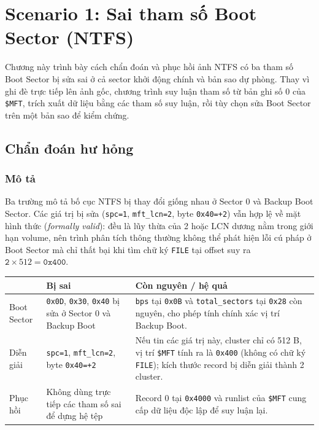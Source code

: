 \chapter{Scenario 1: Sai tham số Boot Sector (NTFS)}

Chương này trình bày cách chẩn đoán và phục hồi ảnh NTFS có ba tham số Boot Sector bị sửa sai ở cả sector khởi động chính và bản sao dự phòng. Thay vì ghi đè trực tiếp lên ảnh gốc, chương trình suy luận tham số từ bản ghi số 0 của \texttt{\$MFT}, trích xuất dữ liệu bằng các tham số suy luận, rồi tùy chọn sửa Boot Sector trên một bản sao để kiểm chứng.

\section{Chẩn đoán hư hỏng}

\subsection{Mô tả}

Ba trường mô tả bố cục NTFS bị thay đổi giống nhau ở Sector 0 và Backup Boot Sector. Các giá trị bị sửa (\texttt{spc=1}, \texttt{mft\_lcn=2}, byte \texttt{0x40=+2}) vẫn hợp lệ về mặt hình thức (\textit{formally valid}): đều là lũy thừa của 2 hoặc LCN dương nằm trong giới hạn volume, nên trình phân tích thông thường không thể phát hiện lỗi cú pháp ở Boot Sector mà chỉ thất bại khi tìm chữ ký \texttt{FILE} tại offset suy ra $\texttt{2} \times 512 = \texttt{0x400}$.

\begin{center}
\begin{tabular}{|p{2.2cm}|p{5.2cm}|p{6.3cm}|}
\hline
 & \textbf{Bị sai} & \textbf{Còn nguyên / hệ quả} \\ \hline
Boot Sector & \texttt{0x0D}, \texttt{0x30}, \texttt{0x40} bị sửa ở Sector 0 và Backup Boot & \texttt{bps} tại \texttt{0x0B} và \texttt{total\_sectors} tại \texttt{0x28} còn nguyên, cho phép tính chính xác vị trí Backup Boot. \\ \hline
Diễn giải & \texttt{spc=1}, \texttt{mft\_lcn=2}, byte \texttt{0x40=+2} & Nếu tin các giá trị này, cluster chỉ có 512 B, vị trí \texttt{\$MFT} tính ra là \texttt{0x400} (không có chữ ký \texttt{FILE}); kích thước record bị diễn giải thành 2 cluster. \\ \hline
Phục hồi & Không dùng trực tiếp các tham số sai để dựng hệ tệp & Record 0 tại \texttt{0x4000} và runlist của \texttt{\$MFT} cung cấp dữ liệu độc lập để suy luận lại. \\ \hline
\end{tabular}
\end{center}

